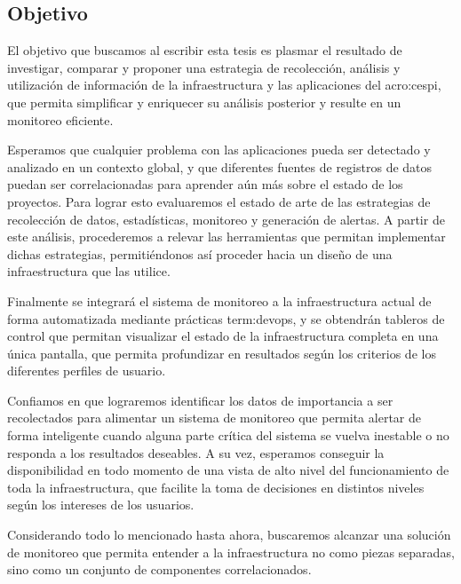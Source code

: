 \subsection{Objetivo}
\label{objetivo}

El objetivo que buscamos al escribir esta tesis es plasmar el resultado de
investigar, comparar y proponer una estrategia de recolección, análisis y
utilización de información de la infraestructura y las aplicaciones del
\gls{acro:cespi}, que permita simplificar y enriquecer su análisis posterior y
resulte en un monitoreo eficiente.

Esperamos que cualquier problema con las aplicaciones pueda ser detectado y
analizado en un contexto global, y que diferentes fuentes de registros de datos
puedan ser correlacionadas para aprender aún más sobre el estado de los
proyectos. Para lograr esto evaluaremos el estado de arte de las estrategias
de recolección de datos, estadísticas, monitoreo y generación de alertas.
A partir de este análisis, procederemos a relevar las
herramientas que permitan implementar dichas estrategias, permitiéndonos así
proceder hacia un diseño de una infraestructura que las utilice.

Finalmente se integrará el sistema de monitoreo a la infraestructura actual de
forma automatizada mediante prácticas \gls{term:devops}, y se obtendrán
tableros de control que permitan visualizar el estado de la infraestructura
completa en una única pantalla, que permita profundizar en resultados según los
criterios de los diferentes perfiles de usuario.

Confiamos en que lograremos identificar los datos de importancia a ser
recolectados para alimentar un sistema de monitoreo que permita alertar de
forma inteligente cuando alguna parte crítica del sistema se vuelva inestable o
no responda a los resultados deseables. A su vez, esperamos conseguir la
disponibilidad en todo momento de una vista de alto nivel del funcionamiento de
toda la infraestructura, que facilite la toma de decisiones en distintos
niveles según los intereses de los usuarios.

Considerando todo lo mencionado hasta ahora, buscaremos alcanzar una solución
de monitoreo que permita entender a la infraestructura no como piezas
separadas, sino como un conjunto de componentes correlacionados.
